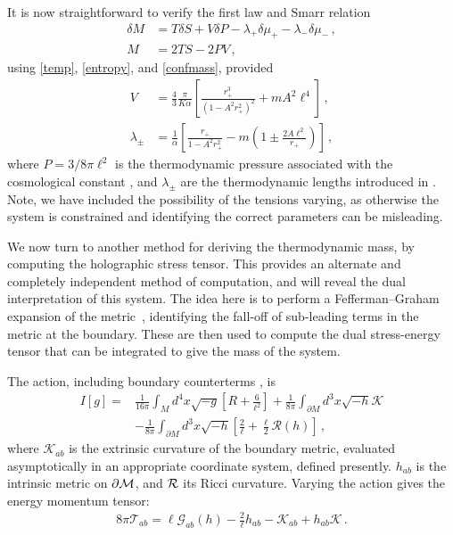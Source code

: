\documentclass[
twoside,
openright,
frontopenright
]{dmathesis}
\newcommand{\nn}{\nonumber}
\newcommand{\todoruth}[2][]{\todo[color=magenta!20,size=\footnotesize,#1]{#2}}
\begin{document}
It is now straightforward to verify the first law and Smarr \cite{Smarr:1972kt}
relation
\begin{align}
\delta M &=T\delta S+V\delta P-\lambda _{+}\delta \mu _{+}
-\lambda_{-}\delta \mu _{-}\,,  \nn \\
M &=2TS-2PV\,,
\end{align}
using \eqref{temp}, \eqref{entropy}, and \eqref{confmass},
provided
\begin{align}\label{vol}
V &= \frac{4}{3}\frac{\pi}{K \alpha}\left[\frac{r_+^3}{(1-A^2r_+^2)^2}
+mA^2\ell^4\right]\,,\nn \\
\lambda_\pm &= \frac{1}{\alpha}\left[\frac{r_+}{1-A^2r_+^2}
-m\left(1\pm\frac{2A\ell^2}{r_+}\right)\right]\,,
\end{align}
where $P = 3/8\pi \ell^2$ is the thermodynamic pressure associated with
the cosmological constant  \cite{Kubiznak:2016qmn}, and $\lambda_\pm$
are the thermodynamic lengths introduced in \cite{Appels:2017xoe,Gregory:2017ogk}.
{Note, we have} included the possibility of the tensions varying, as otherwise
the system is constrained and identifying the correct parameters can be
misleading.

We now turn to another method for deriving the thermodynamic mass,
by computing the holographic stress tensor. This provides an alternate
and completely independent method of computation, and will reveal
the dual interpretation of this system.  The idea here is to perform a
Fefferman--Graham expansion of the metric~\cite{Fefferman:2007rka}, identifying the
fall-off of sub-leading terms in the metric at the boundary. These are
then used to compute the dual stress-energy tensor that can be integrated
to give the mass of the system.

The action, including boundary counterterms
\cite{Balasubramanian:1999re, Emparan:1999pm, Mann:1999pc}, is
\begin{align}
I[g]=&\frac{1}{16\pi}\int_{M}d^{4}x\sqrt{-g}\left[ R+\frac{6}{\ell^{2}}\right]
+ \frac{1}{8\pi}\int_{\partial M}d^{3}x\sqrt{-h}\mathcal{K}\nn \\
&- \frac{1}{8\pi}\int_{\partial M}d^{3}x\sqrt{-h}
\left[ \frac{2}{\ell}+\frac{\ell}{2}\mathcal{R}\left( h\right) \right]\,,
\label{action}
\end{align}
where $\mathcal{K}_{ab}$ is the extrinsic curvature of the boundary
metric, evaluated asymptotically in an appropriate coordinate system,
defined presently. $h_{ab}$ is the intrinsic metric on
$\partial {\cal M}$, and ${\cal R}$ its Ricci curvature. Varying
the action gives the energy momentum tensor:
\begin{align}
8\pi \mathcal{T}_{ab} = \ell \mathcal{G}_{ab}\left(h\right)
-\frac{2}{\ell}h_{ab}-\mathcal{K}_{ab}+h_{ab}\mathcal{K}\,.
\end{align}%
\todoruth{Plot T?}
\end{document}
